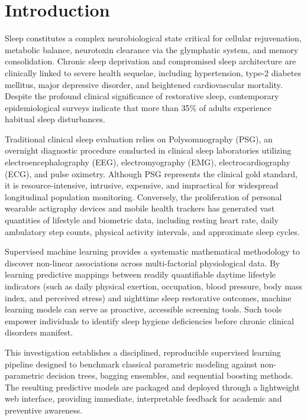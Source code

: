 \documentclass[12pt,a4paper]{article}
\begin{document}
\section{Introduction}
Sleep constitutes a complex neurobiological state critical for cellular rejuvenation, metabolic balance, neurotoxin clearance via the glymphatic system, and memory consolidation. Chronic sleep deprivation and compromised sleep architecture are clinically linked to severe health sequelae, including hypertension, type-2 diabetes mellitus, major depressive disorder, and heightened cardiovascular mortality. Despite the profound clinical significance of restorative sleep, contemporary epidemiological surveys indicate that more than 35\% of adults experience habitual sleep disturbances.

Traditional clinical sleep evaluation relies on Polysomnography (PSG), an overnight diagnostic procedure conducted in clinical sleep laboratories utilizing electroencephalography (EEG), electromyography (EMG), electrocardiography (ECG), and pulse oximetry. Although PSG represents the clinical gold standard, it is resource-intensive, intrusive, expensive, and impractical for widespread longitudinal population monitoring. Conversely, the proliferation of personal wearable actigraphy devices and mobile health trackers has generated vast quantities of lifestyle and biometric data, including resting heart rate, daily ambulatory step counts, physical activity intervals, and approximate sleep cycles.

Supervised machine learning provides a systematic mathematical methodology to discover non-linear associations across multi-factorial physiological data. By learning predictive mappings between readily quantifiable daytime lifestyle indicators (such as daily physical exertion, occupation, blood pressure, body mass index, and perceived stress) and nighttime sleep restorative outcomes, machine learning models can serve as proactive, accessible screening tools. Such tools empower individuals to identify sleep hygiene deficiencies before chronic clinical disorders manifest.

This investigation establishes a disciplined, reproducible supervised learning pipeline designed to benchmark classical parametric modeling against non-parametric decision trees, bagging ensembles, and sequential boosting methods. The resulting predictive models are packaged and deployed through a lightweight web interface, providing immediate, interpretable feedback for academic and preventive awareness.
\end{document}
